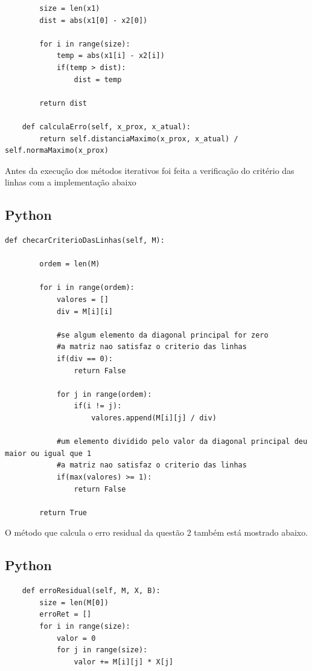 \documentclass{article}
\begin{document}
\begin{itemize}
\begin{lstlisting}
        size = len(x1)
        dist = abs(x1[0] - x2[0])  
        
        for i in range(size):
            temp = abs(x1[i] - x2[i])
            if(temp > dist):
                dist = temp
                
        return dist
            
    def calculaErro(self, x_prox, x_atual):
        return self.distanciaMaximo(x_prox, x_atual) / self.normaMaximo(x_prox)

\end{lstlisting}

\newpage

\text Antes da execução dos métodos iterativos foi feita a verificação do critério das linhas com a implementação abaixo
\subsection*{Python}
\begin{lstlisting}
def checarCriterioDasLinhas(self, M):

        ordem = len(M)

        for i in range(ordem):
            valores = [] 
            div = M[i][i]

            #se algum elemento da diagonal principal for zero
            #a matriz nao satisfaz o criterio das linhas
            if(div == 0):
                return False

            for j in range(ordem):
                if(i != j):
                    valores.append(M[i][j] / div)
                
            #um elemento dividido pelo valor da diagonal principal deu maior ou igual que 1
            #a matriz nao satisfaz o criterio das linhas
            if(max(valores) >= 1):
                return False

        return True
\end{lstlisting}

\text O método que calcula o erro residual da questão 2 também está mostrado abaixo.

\subsection*{Python}
\begin{lstlisting}
    def erroResidual(self, M, X, B):
        size = len(M[0])
        erroRet = []
        for i in range(size):
            valor = 0
            for j in range(size):
                valor += M[i][j] * X[j]


\end{lstlisting}
\end{itemize}
\end{document}
